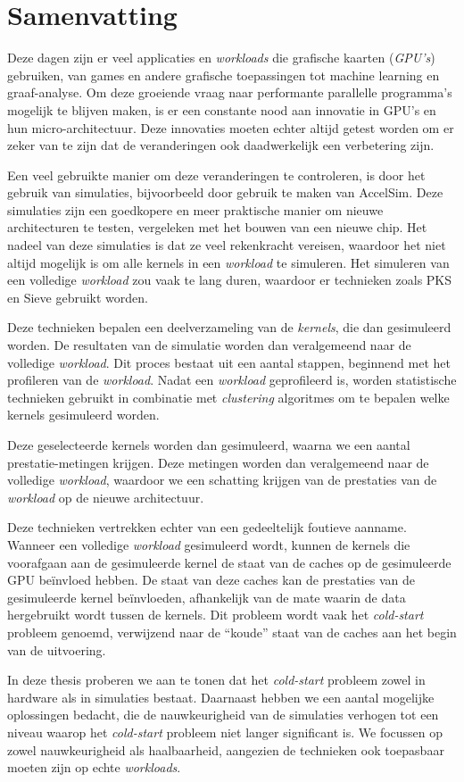 \chapter*{Samenvatting}
Deze dagen zijn er veel applicaties en \textit{workloads} die grafische kaarten (\textit{GPU's}) gebruiken, van games en andere grafische toepassingen tot machine learning en graaf-analyse.
Om deze groeiende vraag naar performante parallelle programma's mogelijk te blijven maken, is er een constante nood aan innovatie in GPU's en hun micro-architectuur.
Deze innovaties moeten echter altijd getest worden om er zeker van te zijn dat de veranderingen ook daadwerkelijk een verbetering zijn.

Een veel gebruikte manier om deze veranderingen te controleren, is door het gebruik van simulaties, bijvoorbeeld door gebruik te maken van AccelSim.
Deze simulaties zijn een goedkopere en meer praktische manier om nieuwe architecturen te testen, vergeleken met het bouwen van een nieuwe chip.
Het nadeel van deze simulaties is dat ze veel rekenkracht vereisen, waardoor het niet altijd mogelijk is om alle kernels in een \textit{workload} te simuleren.
Het simuleren van een volledige \textit{workload} zou vaak te lang duren, waardoor er technieken zoals PKS en Sieve gebruikt worden.

Deze technieken bepalen een deelverzameling van de \textit{kernels}, die dan gesimuleerd worden.
De resultaten van de simulatie worden dan veralgemeend naar de volledige \textit{workload}.
Dit proces bestaat uit een aantal stappen, beginnend met het profileren van de \textit{workload}.
Nadat een \textit{workload} geprofileerd is, worden statistische technieken gebruikt in combinatie met \textit{clustering} algoritmes om te bepalen welke kernels gesimuleerd worden.

Deze geselecteerde kernels worden dan gesimuleerd, waarna we een aantal prestatie-metingen krijgen.
Deze metingen worden dan veralgemeend naar de volledige \textit{workload}, waardoor we een schatting krijgen van de prestaties van de \textit{workload} op de nieuwe architectuur.

Deze technieken vertrekken echter van een gedeeltelijk foutieve aanname.
Wanneer een volledige \textit{workload} gesimuleerd wordt, kunnen de kernels die voorafgaan aan de gesimuleerde kernel de staat van de caches op de gesimuleerde GPU beïnvloed hebben.
De staat van deze caches kan de prestaties van de gesimuleerde kernel beïnvloeden, afhankelijk van de mate waarin de data hergebruikt wordt tussen de kernels.
Dit probleem wordt vaak het \textit{cold-start} probleem genoemd, verwijzend naar de ``koude'' staat van de caches aan het begin van de uitvoering.

In deze thesis proberen we aan te tonen dat het \textit{cold-start} probleem zowel in hardware als in simulaties bestaat.
Daarnaast hebben we een aantal mogelijke oplossingen bedacht, die de nauwkeurigheid van de simulaties verhogen tot een niveau waarop het \textit{cold-start} probleem niet langer significant is.
We focussen op zowel nauwkeurigheid als haalbaarheid, aangezien de technieken ook toepasbaar moeten zijn op echte \textit{workloads}.